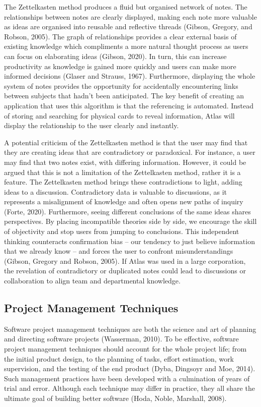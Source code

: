 \documentclass{article}
\begin{document}
The  Zettelkasten method produces a fluid but organised network of notes. The relationships between notes are clearly displayed, making each note more valuable as ideas are organised into reusable and reflective threads (Gibson, Gregory, and Robson, 2005). The graph of relationships provides a clear external basis of existing knowledge which compliments a more natural thought process as users can focus on elaborating ideas (Gibson, 2020). In turn, this can increase productivity as knowledge is gained more quickly and users can make more informed decisions (Glaser and Strauss, 1967). Furthermore, displaying the whole system of notes provides the opportunity for accidentally encountering links between subjects that hadn’t been anticipated. The key benefit of creating an application that uses this algorithm is that the referencing is automated. Instead of storing and searching for physical cards to reveal information, Atlas will display the relationship to the user clearly and instantly.

A potential criticism of the Zettelkasten method is that the user may find that they are creating ideas that are contradictory or paradoxical. For instance, a user may find that two notes exist, with differing information. However, it could be argued that this is not a limitation of the Zettelkasten method, rather it is a feature. The Zettelkasten method brings these contradictions to light, adding ideas to a discussion. Contradictory data is valuable to discussions, as it represents a misalignment of knowledge and often opens new paths of inquiry (Forte, 2020). Furthermore, seeing different conclusions of the same ideas shares perspectives. By placing incompatible theories side by side, we encourage the skill of objectivity and stop users from jumping to conclusions. This independent thinking counteracts confirmation bias – our tendency to just believe information that we already know – and forces the user to confront misunderstandings (Gibson, Gregory and Robson, 2005). If Atlas was used in a large corporation, the revelation of contradictory or duplicated notes could lead to discussions or collaboration to align team and departmental knowledge.


\subsection{Project Management Techniques}

Software project management techniques are both the science and art of planning and directing software projects (Wasserman, 2010). To be effective, software project management techniques should account for the whole project life; from the initial product design, to the planning of tasks, effort estimation, work supervision, and the testing of the end product (Dyba, Dingsoyr and Moe, 2014). Such management practices have been developed with a culmination of years of trial and error. Although each technique may differ in practice, they all share the ultimate goal of building better software (Hoda, Noble, Marshall, 2008).
\end{document}
